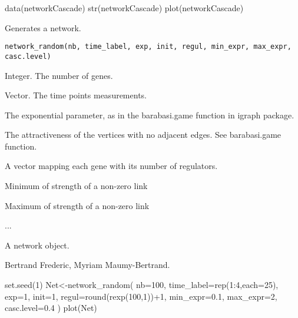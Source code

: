 \documentclass[a4paper]{book}
\begin{document}
%
\begin{Examples}
\begin{ExampleCode}
data(networkCascade)
str(networkCascade)
plot(networkCascade)
\end{ExampleCode}
\end{Examples}
%
\begin{Description}\relax
Generates a network.
\end{Description}
%
\begin{Usage}
\begin{verbatim}
network_random(nb, time_label, exp, init, regul, min_expr, max_expr, casc.level)
\end{verbatim}
\end{Usage}
%
\begin{Arguments}
\begin{ldescription}
\item[\code{nb}] 
Integer. The number of genes.

\item[\code{time\_label}] 
Vector. The time points measurements.

\item[\code{exp}] 
The exponential parameter, as in the barabasi.game function in igraph package.

\item[\code{init}] 
The attractiveness of the vertices with no adjacent edges. See barabasi.game function.

\item[\code{regul}] 
A vector mapping each gene with its number of regulators.

\item[\code{min\_expr}] 
Minimum of strength of a non-zero link

\item[\code{max\_expr}] 
Maximum of strength of a non-zero link

\item[\code{casc.level}] 
...
\end{ldescription}
\end{Arguments}
%
\begin{Value}
A network object. 
\end{Value}
%
\begin{Author}\relax
Bertrand Frederic, Myriam Maumy-Bertrand.
\end{Author}
%
\begin{Examples}
\begin{ExampleCode}
set.seed(1)
Net<-network_random(
	nb=100,
	time_label=rep(1:4,each=25),
	exp=1,
	init=1,
	regul=round(rexp(100,1))+1,
	min_expr=0.1,
	max_expr=2,
	casc.level=0.4
	)
plot(Net)
\end{ExampleCode}
\end{Examples}
\end{document}
